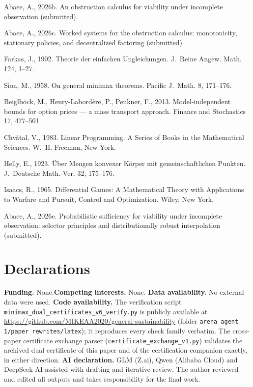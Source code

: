 \documentclass[10pt,twocolumn]{article}
\theoremstyle{definition}
\begin{document}
Abaee, A., 2026b. An obstruction calculus for viability under incomplete
observation (submitted).

Abaee, A., 2026c. Worked systems for the obstruction calculus:
monotonicity, stationary policies, and decentralized factoring
(submitted).

Farkas, J., 1902. Theorie der einfachen Ungleichungen. J.\ Reine Angew.
Math. 124, 1--27.

Sion, M., 1958. On general minimax theorems. Pacific J.\ Math. 8, 171--176.

Beiglb\"ock, M., Henry-Labord\`ere, P., Penkner, F., 2013.
Model-independent bounds for option prices --- a mass transport approach.
Finance and Stochastics 17, 477--501.

Chv\'{a}tal, V., 1983. Linear Programming. A Series of Books in the
Mathematical Sciences. W.~H. Freeman, New York.

Helly, E., 1923. \"Uber Mengen konvexer K\"orper mit gemeinschaftlichen
Punkten. J.~Deutsche Math.-Ver. 32, 175--176.

Isaacs, R., 1965. Differential Games: A Mathematical Theory with
Applications to Warfare and Pursuit, Control and Optimization. Wiley,
New York.

Abaee, A., 2026e. Probabilistic sufficiency for viability under incomplete
observation: selector principles and distributionally robust interpolation
(submitted).

\section*{Declarations}
\textbf{Funding.} None.\quad \textbf{Competing interests.} None.\quad
\textbf{Data availability.} No external data were used.\quad
\textbf{Code availability.} The verification script
\texttt{minimax\_dual\_certificates\_v6\_verify.py} is publicly available
at \url{https://github.com/MIKEAA2020/general-sustainability} (folder
\texttt{arena agent 1/paper rewrites/latex}); it reproduces every check family verbatim. The cross-paper certificate
exchange parser (\texttt{certificate\_exchange\_v1.py}) validates the
archived dual certificate of this paper and of the certification companion
exactly, in either direction.\quad
\textbf{AI declaration.} GLM (Z.ai), Qwen (Alibaba Cloud) and DeepSeek AI
assisted with drafting and iterative review. The author reviewed and
edited all outputs and takes responsibility for the final work.
\end{document}
